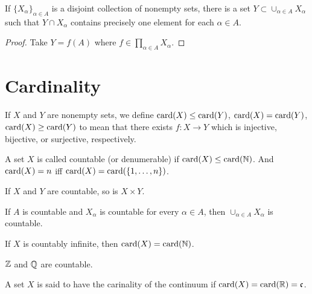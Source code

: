 \begin{corollary}
    If $\{ X_{\alpha} \}_{\alpha \in A}$ is a disjoint collection of nonempty sets, there is a set $Y \subset \cup_{\alpha \in A} X_{\alpha}$ such that $Y \cap X_{\alpha}$ contains precisely one element for each $\alpha \in A$.
\end{corollary}

\begin{proof}
    Take $Y = f(A)$ where $f \in \prod_{\alpha \in A} X_\alpha$.
\end{proof}

\section{Cardinality}

\begin{definition}
    If $X$ and $Y$ are nonempty sets, we define $\mathrm{card} (X) \le \mathrm{card} (Y)$, $\mathrm{card} (X) = \mathrm{card} (Y)$, $\mathrm{card} (X) \ge \mathrm{card} (Y)$ to mean that there exists $f: X \to Y$ which is injective, bijective, or surjective, respectively.
\end{definition}

\begin{definition}
    A set $X$ is called countable (or denumerable) if $\mathrm{card} (X) \le \mathrm{card} (\mathbb{N})$.
    And $\mathrm{card} (X) = n$ iff $\mathrm{card} (X) = \mathrm{card} (\{ 1, \dots, n \})$.
\end{definition}

\begin{proposition}
    If $X$ and $Y$ are countable, so is $X \times Y$.
\end{proposition}

\begin{proposition}
    If $A$ is countable and $X_{\alpha}$ is countable for every $\alpha \in A$, then $\cup_{\alpha \in A} X_{\alpha}$ is countable.
\end{proposition}

\begin{proposition}
    If $X$ is countably infinite, then $\mathrm{card}(X) = \mathrm{card}(\mathbb{N})$.
\end{proposition}

\begin{proposition}
    $\mathbb{Z}$ and $\mathbb{Q}$ are countable.
\end{proposition}

\begin{definition}
    A set $X$ is said to have the carinality of the continuum if $\mathrm{card}(X) = \mathrm{card}(\mathbb{R}) = \mathfrak{c}$.
\end{definition}


